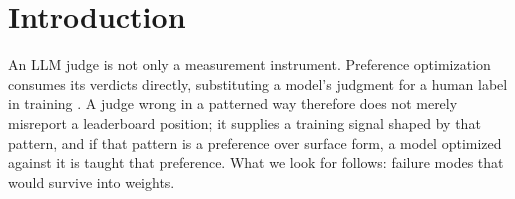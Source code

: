%
%
\section{Introduction}
\label{sec:intro}

An LLM judge is not only a measurement instrument. Preference optimization
consumes its verdicts directly, substituting a model's judgment for a human
label in training \citep{zheng2023judging}. A judge wrong in a patterned way
therefore does not merely misreport a leaderboard position; it supplies a
training signal shaped by that pattern, and if that pattern is a preference
over surface form, a model optimized against it is taught that preference.
What we look for follows: failure modes that would survive into weights.

